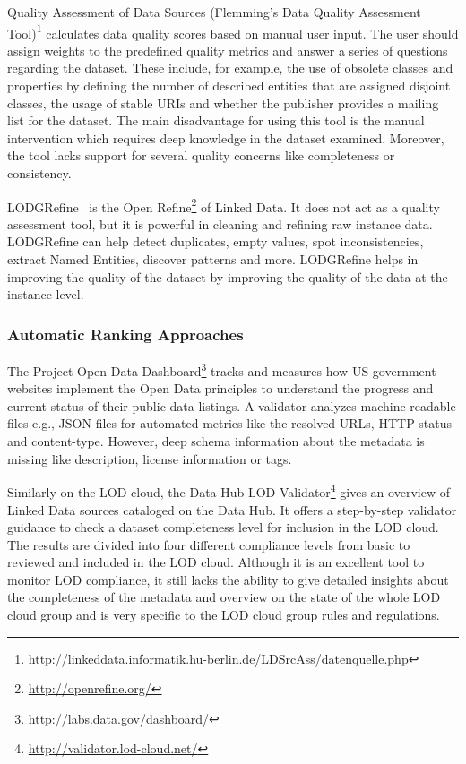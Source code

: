 \documentclass[onecolumn, crcready]{../../Util/LaTEX/iosart2c}
\begin{document}
Quality Assessment of Data Sources (Flemming's Data Quality Assessment Tool)\footnote{\url{http://linkeddata.informatik.hu-berlin.de/LDSrcAss/datenquelle.php}} calculates data quality scores based on manual user input. The user should assign weights to the predefined quality metrics and answer a series of questions regarding the dataset. These include, for example, the use of obsolete classes and properties by defining the number of described entities that are assigned disjoint classes, the usage of stable URIs and whether the publisher provides a mailing list for the dataset. The main disadvantage for using this tool is the manual intervention which requires deep knowledge in the dataset examined. Moreover, the tool lacks support for several quality concerns like completeness or consistency.

LODGRefine~\cite{Verlic:iSemantics:12} is the Open Refine\footnote{\url{http://openrefine.org/}} of Linked Data. It does not act as a quality assessment tool, but it is powerful in cleaning and refining raw instance data. LODGRefine can help detect duplicates, empty values, spot inconsistencies, extract Named Entities, discover patterns and more. LODGRefine helps in improving the quality of the dataset by improving the quality of the data at the instance level.

\subsubsection{Automatic Ranking Approaches}
The Project Open Data Dashboard\footnote{\url{http://labs.data.gov/dashboard/}} tracks and measures how US government websites implement the Open Data principles to understand the progress and current status of their public data listings. A validator analyzes machine readable files e.g., JSON files for automated metrics like the resolved URLs, HTTP status and content-type. However, deep schema information about the metadata is missing like description, license information or tags.

Similarly on the LOD cloud, the Data Hub LOD Validator\footnote{\url{http://validator.lod-cloud.net/}} gives an overview of Linked Data sources cataloged on the Data Hub. It offers a step-by-step validator guidance to check a dataset completeness level for inclusion in the LOD cloud. The results are divided into four different compliance levels from basic to reviewed and included in the LOD cloud. Although it is an excellent tool to monitor LOD compliance, it still lacks the ability to give detailed insights about the completeness of the metadata and overview on the state of the whole LOD cloud group and is very specific to the LOD cloud group rules and regulations.
\end{document}
